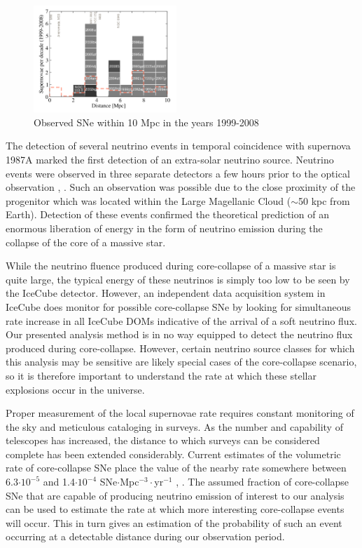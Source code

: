 \documentclass{gatech-thesis}
\begin{document}
\begin{figure}
  \begin{center}
    \includegraphics[width=0.48\textwidth,keepaspectratio]{NearbySNCatalogue.png}
  \end{center}
  \caption[Local SNe within 10 Mpc]{Observed SNe within 10 Mpc in the years 1999-2008 \cite{2011PhRvD..83l3008K}}
  \label{fig:local_ccsne}
\end{figure}
The detection of several neutrino events in temporal coincidence with supernova 1987A marked the first detection of an extra-solar neutrino source. Neutrino events were observed in three separate detectors a few hours prior to the optical observation \cite{1987PhRvL..58.1490H}, \cite{1987PhRvL..58.1494B}. Such an observation was possible due to the close proximity of the progenitor which was located within the Large Magellanic Cloud ($\sim$50 kpc from Earth). Detection of these events confirmed the theoretical prediction of an enormous liberation of energy in the form of neutrino emission during the collapse of the core of a massive star.

While the neutrino fluence produced during core-collapse of a massive star is quite large, the typical energy of these neutrinos is simply too low to be seen by the IceCube detector. However, an independent data acquisition system in IceCube does monitor for possible core-collapse SNe by looking for simultaneous rate increase in all IceCube DOMs indicative of the arrival of a soft neutrino flux. Our presented analysis method is in no way equipped to detect the neutrino flux produced during core-collapse. However, certain neutrino source classes for which this analysis may be sensitive are likely special cases of the core-collapse scenario, so it is therefore important to understand the rate at which these stellar explosions occur in the universe. 

Proper measurement of the local supernovae rate requires constant monitoring of the sky and meticulous cataloging in surveys. As the number and capability of telescopes has increased, the distance to which surveys can be considered complete has been extended considerably. Current estimates of the volumetric rate of core-collapse SNe place the value of the nearby rate somewhere between 6.3$\cdot10^{-5}$ and 1.4$\cdot10^{-4}$ SNe$\cdot$Mpc$^{-3}\cdot$yr$^{-1}$ \cite{2011MNRAS.412.1419L}, \cite{0004-637X-738-2-154}. The assumed fraction of core-collapse SNe that are capable of producing neutrino emission of interest to our analysis can be used to estimate the rate at which more interesting core-collapse events will occur. This in turn gives an estimation of the probability of such an event occurring at a detectable distance during our observation period.
\end{document}
